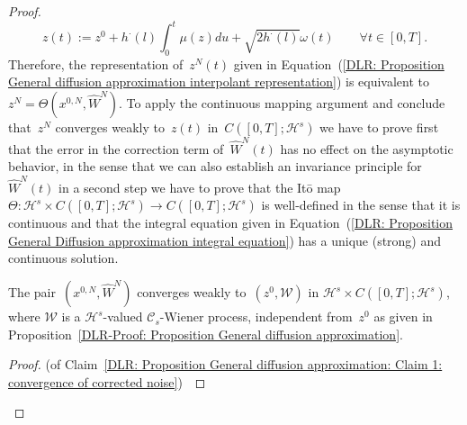 \begin{proof}
  \begin{equation}
    \label{DLR: Proposition General Diffusion approximation integral equation}
   z(t) := z^0 + h^{\cdot}(l) \int_0^t \mu(z) du + \sqrt{2 h^{\cdot}(l)} \omega(t) \qquad \forall t \in [0,T].
  \end{equation}
  Therefore, the representation of~$z^N(t)$ given in Equation~(\ref{DLR: Proposition General diffusion approximation interpolant representation}) is equivalent to~$z^N = \Theta (x^{0,N}, \widehat{W}^N )$. To apply the continuous mapping argument and conclude that~$z^N $ converges weakly to~$ z(t)$ in~$ C([0,T]; \mathcal{H}^s)$ we have to prove first that the error in the correction term of~$\widehat{W}^N(t)$ has no effect on the asymptotic behavior, in the sense that we can also establish an invariance principle for~$\widehat{W}^N(t)$ in a second step we have to prove that the It\={o} map~$\Theta : \mathcal{H}^s \times C([0,T]; \mathcal{H}^s) \to  C([0,T]; \mathcal{H}^s)$ is well-defined in the sense that it is continuous and that the integral equation given in Equation~(\ref{DLR: Proposition General Diffusion approximation integral equation}) has a unique (strong) and continuous solution.
  
  \begin{claim}
   \label{DLR: Proposition General diffusion approximation: Claim 1: convergence of corrected noise}
   The pair~$(x^{0,N}, \widehat{W}^N)$ converges weakly to~$(z^0, \mathcal{W})$ in $\mathcal{H}^s \times C([0,T]; \mathcal{H}^s)$, where $\mathcal{W}$ is a $\mathcal{H}^s$-valued $\mathcal{C}_s$-Wiener process, independent from~$z^0$ as given in Proposition~\ref{DLR-Proof: Proposition General diffusion approximation}.
  \end{claim}
  \begin{proof}(of Claim~\ref{DLR: Proposition General diffusion approximation: Claim 1: convergence of corrected noise})~\autocite[Proposition 3.1]{Pillai2012}
    

\end{proof}
\end{proof}
